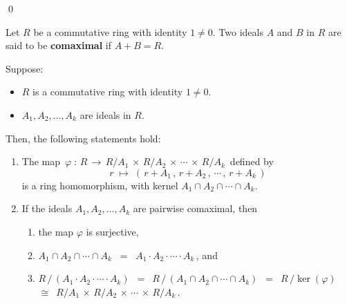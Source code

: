 \qed

\begin{definition}
\mbox{}
\vskip 0.2cm
\noindent
Let $R$ be a commutative ring with identity $1 \neq 0$.
Two ideals $A$ and $B$ in $R$ are said to be \textbf{comaximal} if $A + B = R$.
\end{definition}

\begin{theorem}
\mbox{}
\vskip 0.2cm
\noindent
Suppose:
\begin{itemize}
\item
	$R$ is a commutative ring with identity $1 \neq 0$.
\item
	$A_{1}, A_{2}, \ldots , A_{k}$ are ideals in $R$. 
\end{itemize}
Then, the following statements hold:
\begin{enumerate}
\item
	The map
	\,$\varphi \;:\, R \,\longrightarrow\, R/A_{1} \,\times\, R/A_{2} \,\times\, \cdots \,\times\, R/A_{k}$\,
	defined by
	\begin{equation*}
	r \; \longmapsto \; \left(\, r+A_{1} \,,\, r+A_{2} \,,\, \cdots \,,\, r+A_{k}\,\right)
	\end{equation*}
	is a ring homomorphism, with kernel $A_{1} \cap A_{2} \cap \cdots \cap A_{k}$.
\item\label{surjectivityOfPhiProductEqualsIntersection}
	If the ideals $A_{1}, A_{2}, \ldots, A_{k}$ are pairwise comaximal, then
	\begin{enumerate}
	\item
		the map $\varphi$ is surjective,
	\item
		$A_{1} \cap A_{2} \cap \cdots \cap A_{k} \;\; = \;\; A_{1} \cdot A_{2} \cdot \cdots \cdot A_{k}$\,, and
	\item
		$R \,/\, (A_{1} \cdot A_{2} \cdot \cdots \cdot A_{k})$
		\,$=$\,
			$R \,/\, (A_{1} \cap A_{2} \cap \cdots \cap A_{k})$
		\,$=$\,
			$R \,/ \ker(\varphi)$
		\,$\cong$\,
			$R/A_{1} \,\times\, R/A_{2} \,\times\, \cdots \,\times\, R/A_{k}$\,.
	\end{enumerate}
\end{enumerate}
\end{theorem}
\proof
